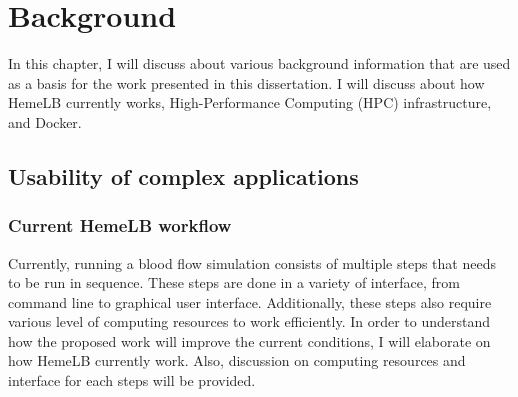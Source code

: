  

\chapter[Background]{Background}

In this chapter, I will discuss about various background information that are used as a basis for the work presented in this dissertation. I will discuss about how HemeLB currently works, High-Performance Computing (HPC) infrastructure, and Docker.


\section{Usability of complex applications}

\subsection{Current HemeLB workflow}

Currently, running a blood flow simulation consists of multiple steps that needs to be run in sequence. These steps are done in a variety of interface, from command line to graphical user interface. Additionally, these steps also require various level of computing resources to work efficiently. In order to understand how the proposed work will improve the current conditions, I will elaborate on how HemeLB currently work. Also, discussion on computing resources and interface for each steps will be provided.




\vspace{1cm}

\noindent%
\begin{minipage}{\linewidth}%
\label{fig:hemelb-workflow}%
\end{minipage}

